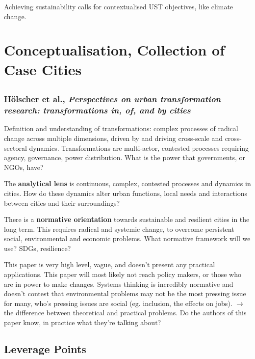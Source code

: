 \documentclass{article}
\begin{document}
Achieving sustainability calls for contextualised UST objectives, like climate change.

\section{Conceptualisation, Collection of Case Cities}

\subsection{}

\subsubsection{Hölscher et al., \textit{Perspectives on urban transformation research: transformations in, of, and by cities}}

Definition and understanding of transformations: complex processes of radical change across multiple dimensions, driven by and driving cross-scale and cross-sectoral dynamics. Transformations are multi-actor, contested processes requiring agency, governance, power distribution. What is the power that governments, or NGOs, have?

The \textbf{analytical lens} is continuous, complex, contested processes and dynamics in cities. How do these dynamics alter urban functions, local needs and interactions between cities and their surroundings?

There is a \textbf{normative orientation} towards sustainable and resilient cities in the long term. This requires radical and systemic change, to overcome persistent social, environmental and economic problems. What normative framework will we use? SDGs, resilience? 

This paper is very high level, vague, and doesn't present any practical applications. This paper will most likely not reach policy makers, or those who are in power to make changes. Systems thinking is incredibly normative and doesn't contest that environmental problems may not be the most pressing issue for many, who's pressing issues are social (eg. inclusion, the effects on jobs). $\rightarrow$ the difference between theoretical and practical problems. Do the authors of this paper know, in practice what they're talking about?

\subsection{Leverage Points}
\end{document}

